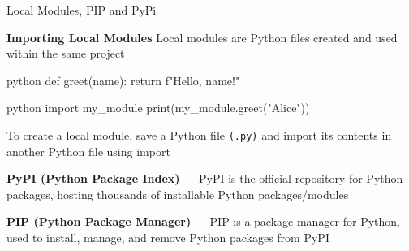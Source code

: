 \documentclass[
	11pt, 
]{beamer}
\begin{document}


\begin{frame}[fragile]{Local Modules, PIP and PyPi}

\begin{block}{\textbf{Importing Local Modules}}
Local modules are Python files created and used within the same project

\begin{mintedbox}{python}
    def greet(name):
    return f"Hello, {name}!"
\end{mintedbox}

\begin{mintedbox}{python}
    import my_module
    print(my_module.greet("Alice"))
\end{mintedbox}

To create a local module, save a Python file \texttt{(.py)} and import its contents in another Python file using import
\end{block}

\vspace{.2cm}

\textbf{PyPI (Python Package Index)} --- PyPI is the official repository for Python packages, hosting thousands of installable Python packages/modules

\vspace{.2cm}

\textbf{PIP (Python Package Manager)} --- PIP is a package manager for Python, used to install, manage, and remove Python packages from PyPI

\end{frame}

\end{document}
